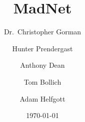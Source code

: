 
\author{Dr.~Christopher Gorman \and Hunter Prendergast \and Anthony Dean
\and Tom Bollich \and Adam Helfgott}
\title{MadNet}
\date{\today}

\renewcommand{\abstractname}{TL;DR}






